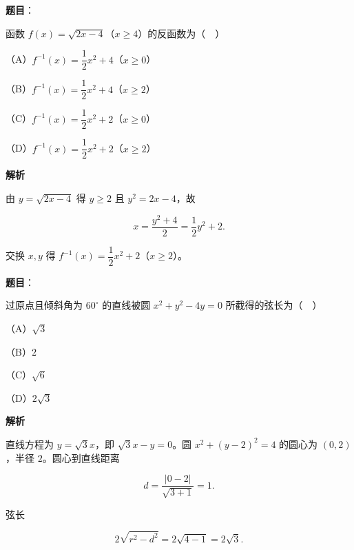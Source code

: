 \begin{answer}

\textbf{题目}：

函数 $f(x)=\sqrt{2x-4}$（$x\geqslant4$）的反函数为（　）

（A）$f^{-1}(x)=\dfrac12x^2+4$（$x\geqslant0$）

（B）$f^{-1}(x)=\dfrac12x^2+4$（$x\geqslant2$）

（C）$f^{-1}(x)=\dfrac12x^2+2$（$x\geqslant0$）

（D）$f^{-1}(x)=\dfrac12x^2+2$（$x\geqslant2$）

\textbf{解析}

由 $y=\sqrt{2x-4}$ 得 $y\geqslant2$ 且 $y^2=2x-4$，故

\nopagebreak[4]
\[x=\frac{y^2+4}2=\frac12y^2+2.\]

交换 $x,y$ 得 $f^{-1}(x)=\dfrac12x^2+2$（$x\geqslant2$）。


\end{answer}
\begin{answer}

\textbf{题目}：

过原点且倾斜角为 $60^\circ$ 的直线被圆 $x^2+y^2-4y=0$ 所截得的弦长为（　）

（A）$\sqrt3$

（B）$2$

（C）$\sqrt6$

（D）$2\sqrt3$

\textbf{解析}

直线方程为 $y=\sqrt3x$，即 $\sqrt3x-y=0$。圆 $x^2+(y-2)^2=4$ 的圆心为 $(0,2)$，半径 $2$。圆心到直线距离

\nopagebreak[4]
\[d=\frac{|0-2|}{\sqrt{3+1}}=1.\]

弦长

\nopagebreak[4]
\[2\sqrt{r^2-d^2}=2\sqrt{4-1}=2\sqrt3.\]


\end{answer}
